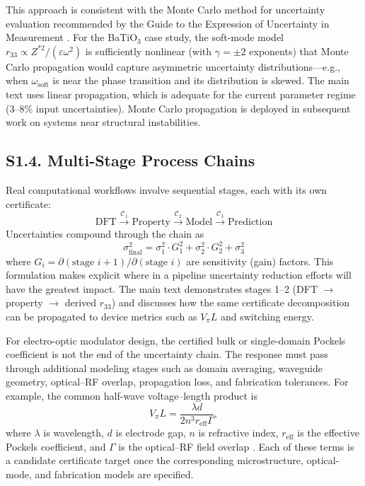 ﻿\documentclass[prb,onecolumn,superscriptaddress,amsmath,amssymb,longbibliography]{revtex4-2}
\newcommand{\cert}[1][]{\mathcal{C}_{#1}}
\begin{document}
This approach is consistent with the Monte Carlo method for uncertainty
evaluation recommended by the Guide to the Expression of Uncertainty in
Measurement \cite{JCGM2008_GUM,JCGM2008_MC,Possolo2015}. For the
BaTiO$_3$ case study, the soft-mode model $r_{33} \propto
Z^{*2}/(\varepsilon \omega^2)$ is sufficiently nonlinear (with $\gamma =
\pm 2$ exponents) that Monte Carlo propagation would capture asymmetric
uncertainty distributions---e.g., when $\omega_{\mathrm{soft}}$ is near the
phase transition and its distribution is skewed. The main text uses linear
propagation, which is adequate for the current parameter regime (3--8\%
input uncertainties). Monte Carlo propagation is deployed in subsequent work
on systems near structural instabilities.


\subsection{S1.4. Multi-Stage Process Chains}
\label{sec:si_chains}

Real computational workflows involve sequential stages, each with its own
certificate:
\begin{equation}
    \boxed{\text{DFT}} \xrightarrow{\cert[1]}
    \boxed{\text{Property}} \xrightarrow{\cert[2]}
    \boxed{\text{Model}} \xrightarrow{\cert[3]}
    \boxed{\text{Prediction}}
\end{equation}
Uncertainties compound through the chain as
\begin{equation}
    \sigma_{\mathrm{final}}^2 = \sigma_1^2 \cdot G_1^2 + \sigma_2^2 \cdot G_2^2 +
    \sigma_3^2
\end{equation}
where $G_i = \partial(\text{stage } i+1)/\partial(\text{stage } i)$ are
sensitivity (gain) factors. This formulation makes explicit where in a pipeline
uncertainty reduction efforts will have the greatest impact. The main text
demonstrates stages 1--2 (DFT $\to$ property $\to$ derived $r_{33}$) and
discusses how the same certificate decomposition can be propagated to device
metrics such as $V_\pi L$ and switching energy.

For electro-optic modulator design, the certified bulk or single-domain
Pockels coefficient is not the end of the uncertainty chain. The response must
pass through additional modeling stages such as domain averaging, waveguide
geometry, optical--RF overlap, propagation loss, and fabrication tolerances.
For example, the common half-wave voltage--length product is
\begin{equation}
    V_\pi L = \frac{\lambda d}{2 n^3 r_{\mathrm{eff}} \Gamma},
    \label{eq:si_VpiL}
\end{equation}
where $\lambda$ is wavelength, $d$ is electrode gap, $n$ is refractive index,
$r_{\mathrm{eff}}$ is the effective Pockels coefficient, and $\Gamma$ is the
optical--RF field overlap \cite{Wooten2000,Reed2010,Wang2018_LN_thin}. Each of
these terms is a candidate certificate target once the corresponding
microstructure, optical-mode, and fabrication models are specified.
\end{document}
